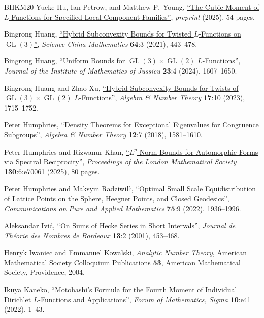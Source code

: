\documentclass[11pt,a4paper]{amsart}
\DeclareMathOperator{\GL}{GL}
\numberwithin{equation}{section}
\theoremstyle{remark}
\theoremstyle{definition}
\begin{document}
\begin{thebibliography}{BHKM20}
 Yueke Hu, Ian Petrow, and Matthew P.~Young, \href{https://arxiv.org/abs/2506.14741v1}{``The Cubic Moment of $L$-Functions for Specified Local Component Families''}, \textit{preprint} (2025), 54 pages.

 Bingrong Huang, \href{https://doi.org/10.1007/s11425-017-9428-6}{``Hybrid Subconvexity Bounds for Twisted $L$-Functions on $\GL(3)$''}, \textit{Science China Mathematics} \textbf{64}:3 (2021), 443--478.

 Bingrong Huang, \href{https://doi.org/10.1017/S1474748023000348}{``Uniform Bounds for $\GL(3) \times \GL(2)$ $L$-Functions''}, \textit{Journal of the Institute of Mathematics of Jussieu} \textbf{23}:4 (2024), 1607--1650.

 Bingrong Huang and Zhao Xu, \href{https://doi.org/10.2140/ant.2023.17.1715}{``Hybrid Subconvexity Bounds for Twists of $\GL(3) \times \GL(2)$ $L$-Functions''}, \textit{Algebra \& Number Theory} \textbf{17}:10 (2023), 1715--1752.

 Peter Humphries, \href{https://doi.org/10.2140/ant.2018.12.1581}{``Density Theorems for Exceptional Eigenvalues for Congruence Subgroups''}, \textit{Algebra \& Number Theory} \textbf{12}:7 (2018), 1581--1610.

 Peter Humphries and Rizwanur Khan, \href{https://doi.org/10.1112/plms.70061}{``$L^p$-Norm Bounds for Automorphic Forms via Spectral Reciprocity''}, \textit{Proceedings of the London Mathematical Society} \textbf{130}:6:e70061 (2025), 80 pages.

 Peter Humphries and Maksym Radziwi\l{}\l{}, \href{https://doi.org/10.1002/cpa.22076}{``Optimal Small Scale Equidistribution of Lattice Points on the Sphere, Heegner Points, and Closed Geodesics''}, \textit{Communications on Pure and Applied Mathematics} \textbf{75}:9 (2022), 1936--1996.

 Aleksandar Ivi\'{c}, \href{https://doi.org/10.5802/jtnb.333}{``On Sums of Hecke Series in Short Intervals''}, \textit{Journal de Th\'{e}orie des Nombres de Bordeaux} \textbf{13}:2 (2001), 453--468.

 Henryk Iwaniec and Emmanuel Kowalski, \href{https://doi.org/10.1090/coll/053}{\textit{Analytic Number Theory}}, American Mathematical Society Colloquium Publications \textbf{53}, American Mathematical Society, Providence, 2004.

 Ikuya Kaneko, \href{https://doi.org/10.1017/fms.2022.33}{``Motohashi's Formula for the Fourth Moment of Individual Dirichlet $L$-Functions and Applications''}, \textit{Forum of Mathematics, Sigma} \textbf{10}:e41 (2022), 1--43.


\end{thebibliography}
\end{document}
